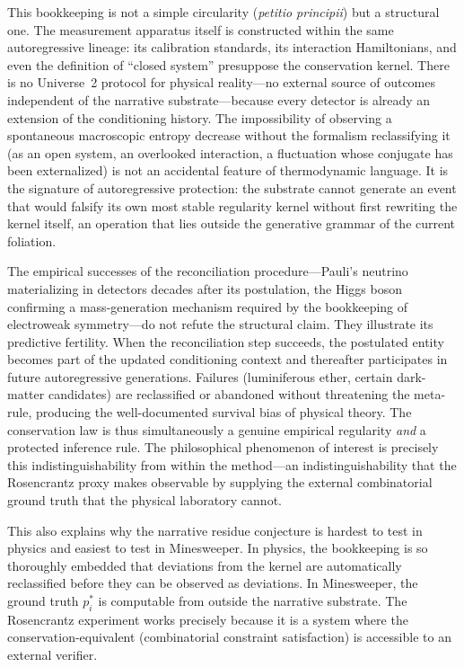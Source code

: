 \documentclass[12pt,a4paper]{article}
\theoremstyle{definition}
\theoremstyle{remark}
\begin{document}
This bookkeeping is not a simple circularity (\textit{petitio
principii}) but a structural one.  The measurement apparatus itself
is constructed within the same autoregressive lineage: its
calibration standards, its interaction Hamiltonians, and even the
definition of ``closed system'' presuppose the conservation kernel.
There is no Universe~2 protocol for physical reality---no external
source of outcomes independent of the narrative substrate---because
every detector is already an extension of the conditioning history.
The impossibility of observing a spontaneous macroscopic entropy
decrease without the formalism reclassifying it (as an open system,
an overlooked interaction, a fluctuation whose conjugate has been
externalized) is not an accidental feature of thermodynamic
language.  It is the signature of autoregressive protection: the
substrate cannot generate an event that would falsify its own most
stable regularity kernel without first rewriting the kernel itself,
an operation that lies outside the generative grammar of the
current foliation.

The empirical successes of the reconciliation procedure---Pauli's
neutrino materializing in detectors decades after its postulation,
the Higgs boson confirming a mass-generation mechanism required by
the bookkeeping of electroweak symmetry---do not refute the
structural claim.  They illustrate its predictive fertility.  When
the reconciliation step succeeds, the postulated entity becomes
part of the updated conditioning context and thereafter
participates in future autoregressive generations.  Failures
(luminiferous ether, certain dark-matter candidates) are
reclassified or abandoned without threatening the meta-rule,
producing the well-documented survival bias of physical theory.
The conservation law is thus simultaneously a genuine empirical
regularity \emph{and} a protected inference rule.  The
philosophical phenomenon of interest is precisely this
indistinguishability from within the method---an
indistinguishability that the Rosencrantz proxy makes observable by
supplying the external combinatorial ground truth that the physical
laboratory cannot.

This also explains why the narrative residue conjecture is hardest
to test in physics and easiest to test in Minesweeper.  In physics,
the bookkeeping is so thoroughly embedded that deviations from the
kernel are automatically reclassified before they can be observed
as deviations.  In Minesweeper, the ground truth $p_i^*$ is
computable from outside the narrative substrate.  The Rosencrantz
experiment works precisely because it is a system where the
conservation-equivalent (combinatorial constraint satisfaction) is
accessible to an external verifier.
\end{document}
